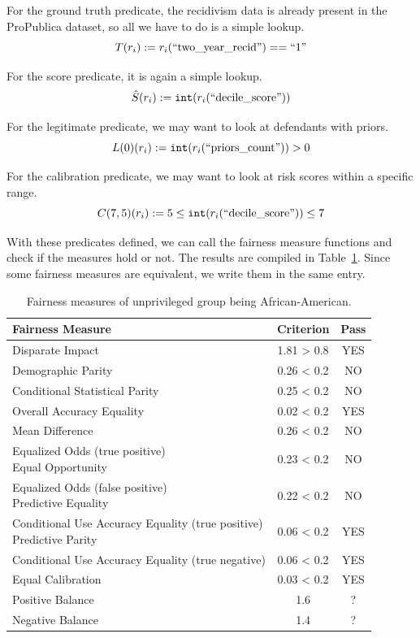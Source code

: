 \documentclass[conference]{IEEEtran}
\begin{document}
For the ground truth predicate, the recidivism data is already present in the ProPublica dataset, so all we have to do is a simple lookup.
\[
    T(r_i) := r_i(\text{``two\_year\_recid''}) == \text{``1''}
\]

For the score predicate, it is again a simple lookup.
\[
    \hat{S}(r_i) := \mathtt{int}(r_i(\text{``decile\_score''}))
\]

For the legitimate predicate, we may want to look at defendants with priors.
\[
    L(0)(r_i) := \mathtt{int}(r_i(\text{``priors\_count''})) > 0
\]

For the calibration predicate, we may want to look at risk scores within a specific range.
\[
    C(7,5)(r_i) := 5 \leq \mathtt{int}(r_i(\text{``decile\_score''})) \leq 7
\]

With these predicates defined, we can call the fairness measure functions and check if the measures hold or not. The results are compiled in Table~\ref{tab:results}. Since some fairness measures are equivalent, we write them in the same entry.

\begin{table}[h]
    \centering
    \begin{tabular}{|l|c|c|} %
        \hline
        \textbf{Fairness Measure} & \textbf{Criterion} & \textbf{Pass} \\
        \hline
Disparate Impact & 1.81 > 0.8 & YES \\
\hline
Demographic Parity & 0.26 < 0.2 & NO \\
\hline
Conditional Statistical Parity & 0.25 < 0.2 & NO \\
\hline
Overall Accuracy Equality & 0.02 < 0.2 & YES \\
\hline
Mean Difference & 0.26 < 0.2 & NO \\
\hline
\makecell[l]{Equalized Odds (true positive) \\ Equal Opportunity} & 0.23 < 0.2 & NO \\
\hline
\makecell[l]{Equalized Odds (false positive) \\ Predictive Equality} & 0.22 < 0.2 & NO \\
\hline
\makecell[l]{Conditional Use Accuracy Equality (true positive) \\ Predictive Parity} & 0.06 < 0.2 & YES \\
\hline
Conditional Use Accuracy Equality (true negative) & 0.06 < 0.2 & YES \\
\hline
Equal Calibration & 0.03 < 0.2 & YES \\
\hline
Positive Balance & 1.6 & ? \\
\hline
Negative Balance & 1.4 & ? \\
\hline
    \end{tabular}
    \caption{Fairness measures of unprivileged group being African-American.}
    \label{tab:results}
\end{table}
\end{document}
